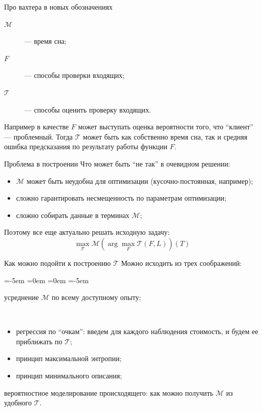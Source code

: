 \documentclass[14pt, fleqn, xcolor={dvipsnames, table}]{beamer}
\begin{document}
\begin{frame}{Про вахтера в новых обозначениях}
\begin{description}
  \item[$\mathcal{M}$] --- время сна;
  \item[$F$] --- способы проверки входящих;
  \item[$\mathcal{T}$] --- способы оценить проверку входящих.
\end{description}
Например в качестве $F$ может выступать оценка вероятности того, что ``клиент'' --- проблемный. Тогда $\mathcal{T}$ может быть как собственно время сна, так и средняя ошибка предсказания по результату работы функции $F$.
\end{frame}

\begin{frame}{Проблема в построении}
Что может быть ``не так'' в очевидном решении:
\begin{itemize}
  \item $\mathcal{M}$ может быть неудобна для оптимизации (кусочно-постоянная, например);
  \item сложно гарантировать несмещенность по параметрам оптимизации;
  \item сложно собирать данные в терминах $\mathcal{M}$;
\end{itemize} 
Поэтому все еще актуально решать исходную задачу:
$$
\max_{\mathcal{T}} \mathcal{M} \left(\arg\max_{F} \mathcal{T}(F, L)\right)(T)
$$
\end{frame}

\begin{frame}{Как можно подойти к построению $\mathcal{T}$}
Можно исходить из трех соображений:
\begin{description}
\small
\leftmargin=-5em
\itemindent=0em
=0em
\leftskip=-5em
  \item[$\mathcal{T} \equiv \mathcal{M}$:] усреднение $\mathcal{M}$ по всему доступному опыту;
  \item[$\arg\max_{F} \mathcal{T}(F, L) = \arg\max_{F} \mathcal{M}(F, L)$:]~\\
  \begin{itemize}
  \itemindent=0em
  \leftskip=-4em
    \item регрессия по ``очкам'': введем для каждого наблюдения стоимость, и будем ее приближать по $\mathcal{T}$;
    \item принцип максимальной энтропии;
    \item принцип минимального описания;
  \end{itemize}
  \item[$\max_{\mathcal{T}} \mathcal{M} \left(\arg\max_{F} \mathcal{T}(F, L)\right)(T)$:] вероятностное моделирование происходящего: как можно получить $\mathcal{M}$ из удобного $\mathcal{T}$.
\end{description} 
\end{frame}
\end{document}
